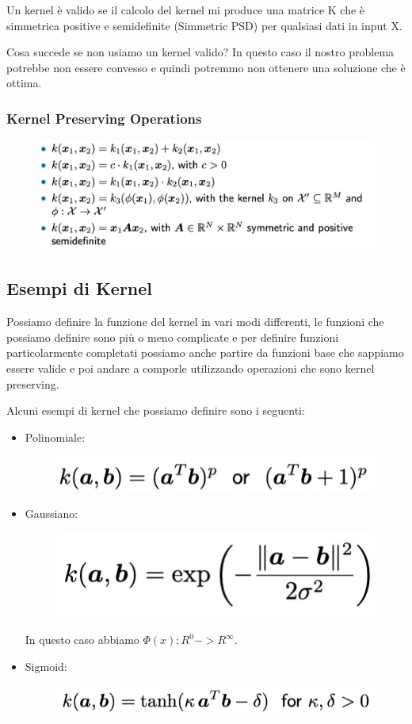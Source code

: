 \documentclass[14pt]{extreport}
\begin{document}
Un kernel è valido se il calcolo del kernel mi produce una matrice K che è simmetrica positive e semidefinite (Simmetric PSD) per qualsiasi dati in
input X.

Cosa succede se non usiamo un kernel valido? In questo caso il nostro problema potrebbe non essere convesso e quindi potremmo non ottenere una
soluzione che è ottima.

\subsubsection{Kernel Preserving Operations}

\begin{figure}[H]
\centering
\includegraphics[width=0.7\linewidth]{342.jpeg}
\end{figure}

\subsection{Esempi di Kernel}

Possiamo definire la funzione del kernel in vari modi differenti, le funzioni che possiamo definire sono più o meno complicate e per definire funzioni
particolarmente completati possiamo anche partire da funzioni base che sappiamo essere valide e poi andare a comporle utilizzando operazioni che sono
kernel preserving.

Alcuni esempi di kernel che possiamo definire sono i seguenti:

\begin{itemize}
\item Polinomiale: \begin{figure}[H]
\centering
\includegraphics[width=0.5\linewidth]{343.jpeg}
\end{figure}
\item Gaussiano:\begin{figure}[H]
\centering
\includegraphics[width=0.4\linewidth]{344.jpeg}
\end{figure}
In questo caso abbiamo $\Phi(x): R^0 -> R^\infty$.
\item Sigmoid:\begin{figure}[H]
\centering
\includegraphics[width=0.5\linewidth]{345.jpeg}
\end{figure}
\end{itemize}
\end{document}
